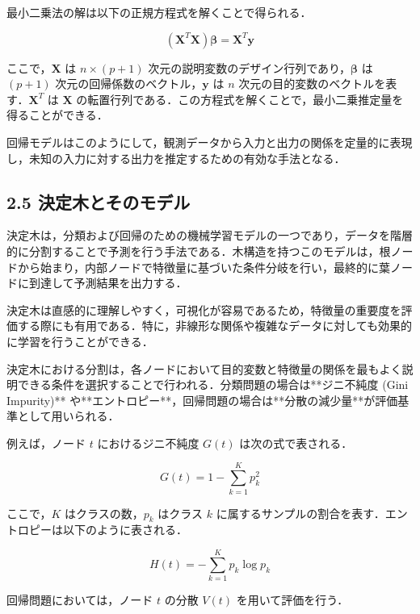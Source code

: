 \begin{itemize}
	最小二乗法の解は以下の正規方程式を解くことで得られる．
	
	\begin{equation}
		(\mathbf{X}^T \mathbf{X}) \mathbf{\beta} = \mathbf{X}^T \mathbf{y}
	\end{equation}
	
	ここで，$\mathbf{X}$ は $n \times (p+1)$ 次元の説明変数のデザイン行列であり，$\mathbf{\beta}$ は $(p+1)$ 次元の回帰係数のベクトル，$\mathbf{y}$ は $n$ 次元の目的変数のベクトルを表す．$\mathbf{X}^T$ は $\mathbf{X}$ の転置行列である．この方程式を解くことで，最小二乗推定量を得ることができる．
	
	回帰モデルはこのようにして，観測データから入力と出力の関係を定量的に表現し，未知の入力に対する出力を推定するための有効な手法となる．
\end{itemize}

\subsection*{2.5 決定木とそのモデル}
決定木は，分類および回帰のための機械学習モデルの一つであり，データを階層的に分割することで予測を行う手法である．木構造を持つこのモデルは，根ノードから始まり，内部ノードで特徴量に基づいた条件分岐を行い，最終的に葉ノードに到達して予測結果を出力する．

決定木は直感的に理解しやすく，可視化が容易であるため，特徴量の重要度を評価する際にも有用である．特に，非線形な関係や複雑なデータに対しても効果的に学習を行うことができる．

決定木における分割は，各ノードにおいて目的変数と特徴量の関係を最もよく説明できる条件を選択することで行われる．分類問題の場合は**ジニ不純度 (Gini Impurity)** や**エントロピー**，回帰問題の場合は**分散の減少量**が評価基準として用いられる．

例えば，ノード $t$ におけるジニ不純度 $G(t)$ は次の式で表される．

\begin{equation}
	G(t) = 1 - \sum_{k=1}^{K} p_k^2
\end{equation}

ここで，$K$ はクラスの数，$p_k$ はクラス $k$ に属するサンプルの割合を表す．エントロピーは以下のように表される．

\begin{equation}
	H(t) = - \sum_{k=1}^{K} p_k \log p_k
\end{equation}

回帰問題においては，ノード $t$ の分散 $V(t)$ を用いて評価を行う．

